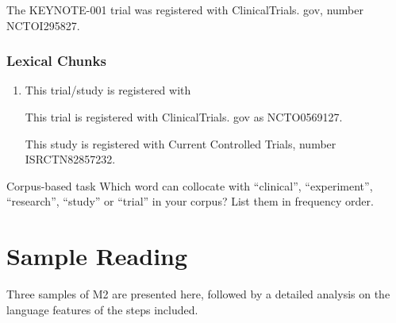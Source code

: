 \documentclass{ctexbook}
\begin{document}
    \begin{eg}{}
      The KEYNOTE-001 trial was registered with ClinicalTrials. gov, number NCTOI295827.  
    \end{eg}

    \subsubsection{Lexical Chunks}

    \begin{enumerate}
      \item This trial/study is registered with
      \begin{eg}{}
        This trial is registered with ClinicalTrials. gov as NCTO0569127.
      \end{eg}

      \begin{eg}{}
        This study is registered with Current Controlled Trials, number ISRCTN82857232.
      \end{eg}
    \end{enumerate}

    \begin{task}{Corpus-based task}
      Which word can collocate with ``clinical'', ``experiment'', ``research'', ``study'' or ``trial'' in your corpus? List them in frequency order.
    \end{task}

\section{Sample Reading}

Three samples of M2 are presented here, followed by a detailed analysis on the language features of the steps included.
\end{document}

